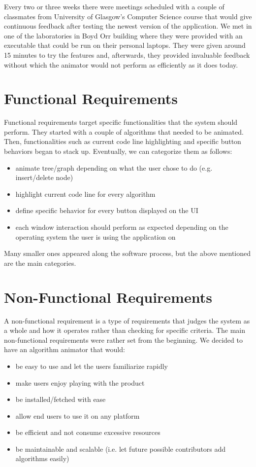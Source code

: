 \documentclass{l4proj}
\begin{document}
Every two or three weeks there were meetings scheduled with a couple of classmates from University of Glasgow's Computer Science course that would give continuous feedback after testing the newest version of the application. We met in one of the laboratories in Boyd Orr building where they were provided with an executable that could be run on their personal laptops. They were given around 15 minutes to try the features and, afterwards, they provided invaluable feedback without which the animator would not perform as efficiently as it does today.

\section{Functional Requirements}

Functional requirements target specific functionalities that the system should perform. They started with a couple of algorithms that needed to be animated. Then, functionalities such as current code line highlighting and specific button behaviors began to stack up. Eventually, we can categorize them as follows:

\begin{itemize}
\item animate tree/graph depending on what the user chose to do (e.g. insert/delete node)
\item highlight current code line for every algorithm
\item define specific behavior for every button displayed on the UI
\item each window interaction should perform as expected depending on the operating system the user is using the application on
\end{itemize}

Many smaller ones appeared along the software process, but the above mentioned are the main categories.

\section{Non-Functional Requirements}

A non-functional requirement is a type of requirements that judges the system as a whole and how it operates rather than checking for specific criteria. The main non-functional requirements were rather set from the beginning. We decided to have an algorithm animator that would:

\begin{itemize}
\item be easy to use and let the users familiarize rapidly
\item make users enjoy playing with the product
\item be installed/fetched with ease
\item allow end users to use it on any platform
\item be efficient and not consume excessive resources
\item be maintainable and scalable (i.e. let future possible contributors add algorithms easily)
\end{itemize}
\end{document}
